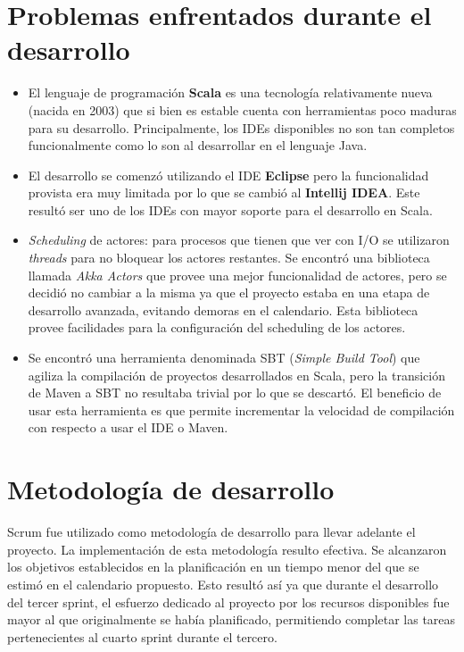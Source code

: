 \documentclass[12pt,a4paper]{article}
\let\stdsection\section
\renewcommand\section{\newpage\stdsection}
\begin{document}
\section{Problemas enfrentados durante el desarrollo}

\begin{itemize}
	\item El lenguaje de programación \textbf{Scala} es una tecnología relativamente nueva (nacida en 2003) que
	si bien es estable cuenta con herramientas poco maduras para su desarrollo. Principalmente, los IDEs disponibles
	no son tan completos funcionalmente como lo son al desarrollar en el lenguaje Java.

	\item El desarrollo se comenzó utilizando el IDE \textbf{Eclipse} pero la funcionalidad provista era muy
	limitada por lo que se cambió al \textbf{Intellij IDEA}. Este resultó ser uno de los IDEs con mayor soporte
	para el desarrollo en Scala.

	\item \textit{Scheduling} de actores: para procesos que tienen que ver con I/O se utilizaron \textit{threads}
	para no bloquear los actores restantes. Se encontró una biblioteca llamada \textit{Akka Actors} \cite{akka} que 
	provee una mejor funcionalidad de actores, pero se decidió no cambiar a la misma ya que el proyecto estaba
	en una etapa de desarrollo avanzada, evitando demoras en el calendario. Esta biblioteca provee facilidades
	para la configuración del scheduling de los actores.

    \item Se encontró una herramienta denominada SBT \cite{sbt} (\textit{Simple Build Tool}) que agiliza la compilación
    de proyectos desarrollados en Scala, pero la transición de Maven a SBT no resultaba trivial por lo que
    se descartó. El beneficio de usar esta herramienta es que permite incrementar la velocidad de compilación
    con respecto a usar el IDE o Maven.
    
\end{itemize}

\section{Metodología de desarrollo}

Scrum fue utilizado como metodología de desarrollo para llevar adelante el proyecto. La implementación de esta metodología resulto efectiva. Se alcanzaron los objetivos establecidos en la planificación en un tiempo menor 
del que se estimó en el calendario propuesto. Esto resultó así ya que durante el desarrollo del tercer sprint,
el esfuerzo dedicado al proyecto por los recursos disponibles fue mayor al que originalmente se había planificado, permitiendo completar las tareas pertenecientes al cuarto sprint durante el tercero.
\end{document}
